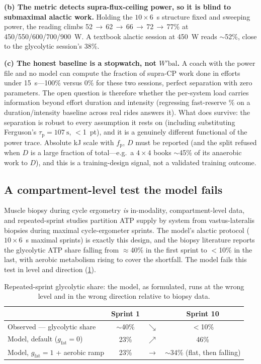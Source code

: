 \documentclass[11pt,a4paper]{article}
\newcommand{\Wbal}{\ensuremath{W'\!\text{bal}}}
\newcommand{\CP}{\ensuremath{\mathrm{CP}}}
\newcommand{\fp}{\ensuremath{f_{\mathrm p}}}
\newcommand{\taup}{\ensuremath{\tau_{\mathrm p}}}
\begin{document}
\textbf{(b) The metric detects supra-flux-ceiling power, so it is blind to submaximal alactic work.}
Holding the $10\times6$~s structure fixed and sweeping power, the reading climbs
52\,$\to$\,62\,$\to$\,66\,$\to$\,72\,$\to$\,77\% at 450/550/600/700/900~W. A textbook alactic session at
450~W reads $\sim$52\%, close to the glycolytic session's 38\%.

\textbf{(c) The honest baseline is a stopwatch, not \Wbal.} A coach with the power file and no model can
compute the fraction of supra-\CP{} work done in efforts under 15~s---100\% versus 0\% for these two
sessions, perfect separation with zero parameters. The open question is therefore whether the per-system
load carries information beyond effort duration and intensity (regressing fast-reserve \% on a
duration/intensity baseline across real rides answers it). What does survive: the separation is robust to
every assumption it rests on (including substituting Ferguson's $\taup = \SI{107}{\second}$, $<$1~pt), and
it is a genuinely different functional of the power trace. Absolute kJ scale with \fp, $D$ must be reported
(and the split refused when $D$ is a large fraction of total---e.g.\ a $4\times4$ books $\sim$45\% of its
anaerobic work to $D$), and this is a training-design signal, not a validated training outcome.

\subsection{A compartment-level test the model fails}\label{subsec:repeatedsprint}

Muscle biopsy during cycle ergometry \emph{is} in-modality, compartment-level data, and repeated-sprint
studies partition ATP supply by system from vastus-lateralis biopsies during maximal cycle-ergometer
sprints.\citep{Gaitanos1993,SciRep2024} The model's alactic protocol ($10\times6$~s maximal sprints) is
exactly this design, and the biopsy literature reports the glycolytic ATP share falling from $\approx$40\%
in the first sprint to $<$10\% in the last, with aerobic metabolism rising to cover the shortfall. The
model fails this test in level and direction (\cref{tab:repeatsprint}).

\begin{table}[htbp]\centering\small
\caption{Repeated-sprint glycolytic share: the model, as formulated, runs at the wrong level and in the
wrong direction relative to biopsy data.}
\label{tab:repeatsprint}
\renewcommand{\arraystretch}{1.2}
\begin{tabular}{@{}lccc@{}}
\toprule
 & \textbf{Sprint 1} & & \textbf{Sprint 10} \\
\midrule
Observed\citep{Gaitanos1993,SciRep2024} --- glycolytic share & $\sim$40\% & $\searrow$ & $<$10\% \\
Model, default ($g_{\mathrm{fat}}=0$) & 23\% & $\nearrow$ & 46\% \\
Model, $g_{\mathrm{fat}}=1$ + aerobic ramp & 23\% & $\rightarrow$ & $\sim$34\% (flat, then falling) \\
\bottomrule
\end{tabular}
\end{table}
\end{document}
